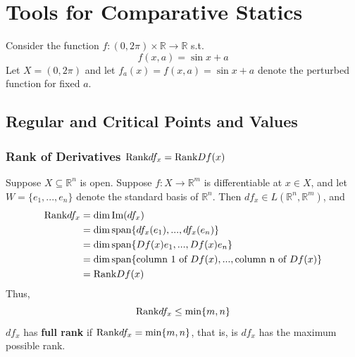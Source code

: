 \documentclass[11pt]{elegantbook}
\begin{document}
\chapter{Tools for Comparative Statics}
Consider the function $f:(0,2\pi) \times \mathbb{R} \rightarrow \mathbb{R}$ s.t. $$f(x,a)=\sin x+a$$
Let $X=(0,2\pi)$ and let $f_a(x) = f(x, a) = \sin x + a$ denote the perturbed function for fixed $a$.



\section{Regular and Critical Points and Values}
\subsection{Rank of Derivatives $\textnormal{Rank} df_x=\textnormal{Rank} Df(x)$}
Suppose $X \subseteq \mathbb{R}^n$ is open. Suppose $f : X \rightarrow \mathbb{R}^m$ is differentiable at $x \in X$, and let $W = \{e_1, . . . , e_n\}$ denote the standard basis of $\mathbb{R}^n$. Then $df_x \in L(\mathbb{R}^n, \mathbb{R}^m)$, and
\begin{equation}
    \begin{aligned}
        \textnormal{Rank} df_x &= \dim \textnormal{Im}(df_x)\\
        &= \dim \textnormal{span}\{df_x(e_1), . . . , df_x(e_n)\}\\
        &= \dim \textnormal{span}\{Df(x)e_1, . . . , Df(x)e_n\}\\
        &= \dim \textnormal{span}\{\textnormal{column 1 of }Df(x), . . . , \textnormal{column n of }Df(x)\}\\
        &=\textnormal{Rank} Df(x)
    \end{aligned}
    \nonumber
\end{equation}
Thus,
$$\textnormal{Rank} df_x\leq\min\{m,n\}$$
$df_x$ has \textbf{full rank} if $\textnormal{Rank} df_x=\min\{m,n\}$, that is, is $df_x$ has the maximum possible rank.
\end{document}
